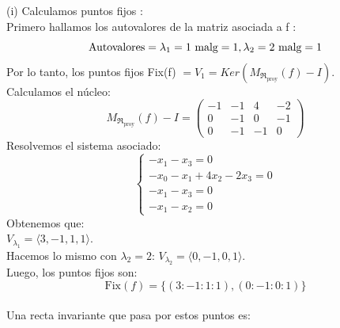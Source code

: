 {
(i) Calculamos puntos fijos : \\
Primero hallamos los autovalores de la matriz asociada a f : \\
\[
\text{Autovalores} =  \lambda_1=1 \text{ malg}=1, \lambda_2= 2\text{ malg}=1\\
\]
Por lo tanto, los puntos fijos Fix(f) $= V_1 = Ker(M_{\mathfrak{R}_{\text{proy}}}(f) - I) $.\\
Calculamos el núcleo:
\[
M_{\mathfrak{R}_{\text{proy}}}(f) - I =
\begin{pmatrix}
-1 & -1 & 4 & -2 \\
    0 & -1 & 0 & -1 \\
    0 & -1 & -1 & 0
\end{pmatrix}
\]
Resolvemos el sistema asociado:
\[
\begin{cases}
    -x_1 - x_3 = 0 \\
    -x_0 - x_1 + 4x_2 - 2x_3 = 0 \\
    -x_1 - x_3 = 0 \\
    -x_1 - x_2 = 0
\end{cases}
\]
Obtenemos que: \\
$V_{\lambda_1} = \langle 3,-1,1,1 \rangle$. \\
Hacemos lo mismo con $\lambda_2 = 2$: $V_{\lambda_2} = \langle 0,-1,0,1 \rangle$. \\
Luego, los puntos fijos son:\\
\[\text{Fix}(f)= \{(3 : -1 : 1 : 1), (0:-1:0:1)\}\]
\\
Una recta invariante que pasa por estos puntos es: \\
 
}
